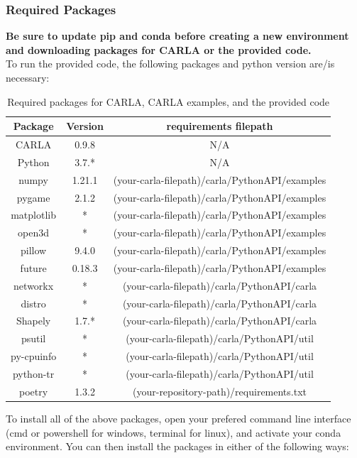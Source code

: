 \documentclass[12pt,oneside,letterpaper]{article}
\begin{document}
\subsubsection{Required Packages}
\label{subsec:Requirements}
\textbf{Be sure to update pip and conda before creating a new environment and downloading packages for CARLA or the provided code.} \\
To run the provided code, the following packages and python version are/is necessary:
\begin{table}[h]
\centering
 \begin{tabular}{| c | c | c |}
 \hline
 Package & Version & requirements filepath \\
 \hline 
CARLA & 0.9.8 & N/A \\
 Python & 3.7.* & N/A \\
 numpy & 1.21.1 & (your-carla-filepath)/carla/PythonAPI/examples \\
 pygame & 2.1.2 & (your-carla-filepath)/carla/PythonAPI/examples \\
 matplotlib & * & (your-carla-filepath)/carla/PythonAPI/examples \\
 open3d & * & (your-carla-filepath)/carla/PythonAPI/examples \\
 pillow & 9.4.0 & (your-carla-filepath)/carla/PythonAPI/examples \\
 future & 0.18.3 & (your-carla-filepath)/carla/PythonAPI/examples \\
 networkx & * & (your-carla-filepath)/carla/PythonAPI/carla \\
 distro & * & (your-carla-filepath)/carla/PythonAPI/carla \\
 Shapely & 1.7.* & (your-carla-filepath)/carla/PythonAPI/carla \\
 psutil & * &  (your-carla-filepath)/carla/PythonAPI/util \\
 py-cpuinfo & * & (your-carla-filepath)/carla/PythonAPI/util \\
 python-tr & * & (your-carla-filepath)/carla/PythonAPI/util \\
 poetry & 1.3.2 & (your-repository-path)/requirements.txt \\
 \hline
 \end{tabular}
\caption{Required packages for CARLA, CARLA examples, and the provided code}
\label{table:RequirementsTable}
\end{table}

To install all of the above packages, open your prefered command line interface (cmd or powershell for windows, terminal for linux), and activate your conda environment. You can then install the packages in either of the following ways:
\end{document}
